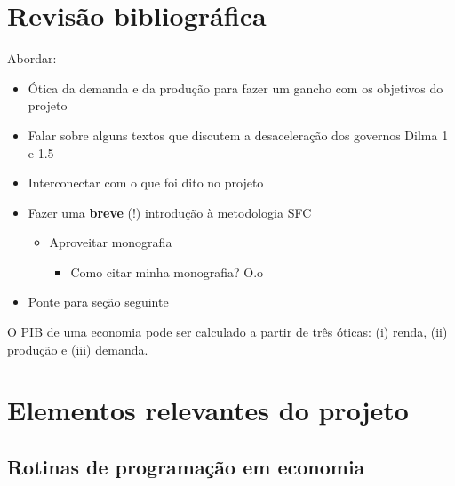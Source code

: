 \documentclass[12pt]{report}
\begin{document}
{\let\clearpage\relax \chapter{Revisão bibliográfica}\label{Rev}}

Abordar:

\begin{itemize}
 \item Ótica da demanda e da produção para fazer um gancho com os objetivos do projeto
 \item Falar sobre alguns textos que discutem a desaceleração dos governos Dilma 1 e 1.5
 \item Interconectar com o que foi dito no projeto
 \item Fazer uma \textbf{breve} (!) introdução à metodologia SFC
 	\begin{itemize}
 		\item Aproveitar monografia
 			\begin{itemize}
				\item Como citar minha monografia? O.o
 			\end{itemize}
 	\end{itemize}
 \item Ponte para seção seguinte
\end{itemize}

O PIB de uma economia pode ser calculado a partir de três óticas: (i) renda, (ii) produção e (iii) demanda. 




{\let\clearpage\relax \chapter{Elementos relevantes do projeto}\label{relev}}


%

\section{Rotinas de programação em economia}
\end{document}
